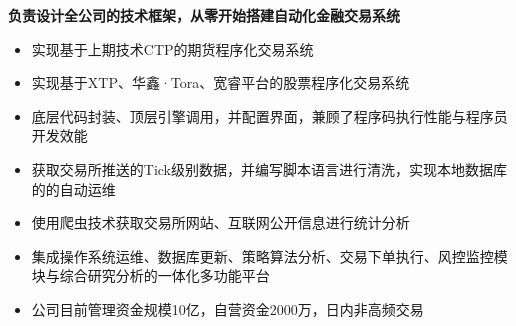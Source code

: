 \documentclass[10pt,a4paper]{altacv}
\begin{document}

\begin{fullwidth}
\makecvheader
\end{fullwidth}



\textbf{负责设计全公司的技术框架，从零开始搭建自动化金融交易系统}
\vspace{0.15cm}

\begin{itemize}
    \item 实现基于上期技术CTP的期货程序化交易系统
    \item 实现基于XTP、华鑫·Tora、宽睿平台的股票程序化交易系统
    \item 底层代码封装、顶层引擎调用，并配置界面，兼顾了程序码执行性能与程序员开发效能
    \item 获取交易所推送的Tick级别数据，并编写脚本语言进行清洗，实现本地数据库的的自动运维
    \item 使用爬虫技术获取交易所网站、互联网公开信息进行统计分析
    \item 集成操作系统运维、数据库更新、策略算法分析、交易下单执行、风控监控模块与综合研究分析的一体化多功能平台
    \item 公司目前管理资金规模10亿，自营资金2000万，日内非高频交易
\end{itemize}
\end{document}
